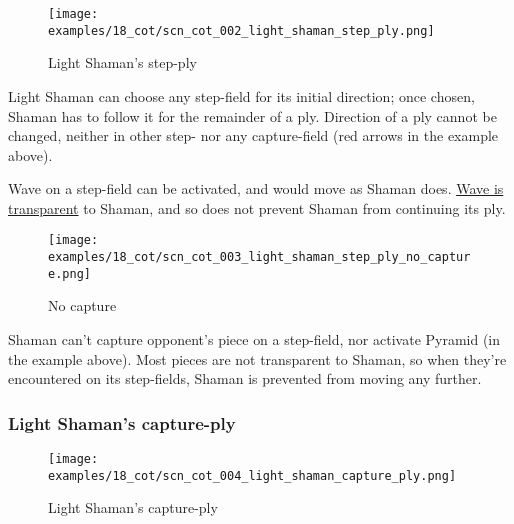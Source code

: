 \vspace*{-1.4\baselineskip}
\noindent
\begin{figure}[!h]
\texttt{[image: examples/18\_cot/scn\_cot\_002\_light\_shaman\_step\_ply.png]}
\vspace*{-1.4\baselineskip}
\caption{Light Shaman's step-ply}
\label{fig:scn_cot_002_light_shaman_step_ply}
\end{figure}

\vspace*{-0.4\baselineskip}
Light Shaman can choose any step-field for its initial direction; once chosen, Shaman
has to follow it for the remainder of a ply. Direction of a ply cannot be changed,
neither in other step- nor any capture-field (red arrows in the example above).

Wave on a step-field can be activated, and would move as Shaman does.
\hyperref[fig:scn_mv_011_wave_is_transparent]{Wave is transparent} to Shaman, and
so does not prevent Shaman from continuing its ply.

\noindent
\begin{wrapfigure}[8]{l}{0.4\textwidth}
\centering
\texttt{[image: examples/18\_cot/scn\_cot\_003\_light\_shaman\_step\_ply\_no\_capture.png]}
\vspace*{-1.4\baselineskip}
\caption{No capture}
\label{fig:scn_cot_003_light_shaman_step_ply_no_capture}
\end{wrapfigure}
Shaman can't capture opponent's piece on a step-field, nor activate Pyramid (in
the example above). Most pieces are not transparent to Shaman, so when they're
encountered on its step-fields, Shaman is prevented from moving any further.

\clearpage %

\subsubsection*{Light Shaman's capture-ply}
\label{sec:Conquest of Tlalocan/Shaman/Movement/Light Shaman's capture-ply}

\vspace*{-1.4\baselineskip}
\noindent
\begin{figure}[!h]
\texttt{[image: examples/18\_cot/scn\_cot\_004\_light\_shaman\_capture\_ply.png]}
\vspace*{-1.4\baselineskip}
\caption{Light Shaman's capture-ply}
\label{fig:scn_cot_004_light_shaman_capture_ply}
\end{figure}

